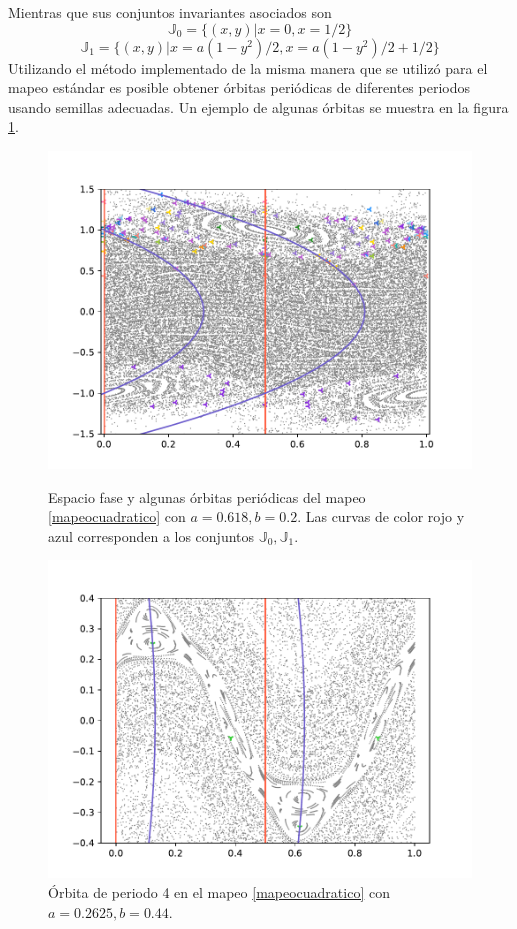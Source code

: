 Mientras que sus conjuntos invariantes asociados son
\begin{equation}
	\mathbb{J}_{0} = \{ (x,y) | x=0 ,x=1/2\}
	\label{conjunto invariante cuadratico 0}
\end{equation}
\begin{equation}	
	\mathbb{J}_{1} = \{ (x,y)| x= a(1-y^{2})/2, x = a(1-y^{2})/2+1/2
		\}
	\label{conjunto invariante cuadratico 1}
\end{equation}
Utilizando el m\'etodo implementado de la misma manera que se utiliz\'o para el mapeo est\'andar es posible obtener \'orbitas peri\'odicas de diferentes periodos usando semillas adecuadas. Un ejemplo de algunas \'orbitas se muestra en la figura \ref{grafmapeocuadratico1}. \\

\begin{figure}
	\includegraphics[scale=0.7]{MapeoCuadraDifP}
	\label{grafmapeocuadratico1}
	\caption{Espacio fase y algunas \'orbitas peri\'odicas del mapeo \eqref{mapeocuadratico} con $ a = 0.618, b=0.2$. Las curvas de color rojo y azul corresponden a los conjuntos $\mathbb{J}_{0}, \mathbb{J}_{1}$.} 
\end{figure}
\begin{figure}
	\centering
	\includegraphics[scale=0.6]{MApeoCP4A}
	\caption{\'Orbita de periodo 4 en el mapeo \eqref{mapeocuadratico} con $a = 0.2625, b = 0.44$.}
	\label{grafmapeocuadraper4}
\end{figure}

